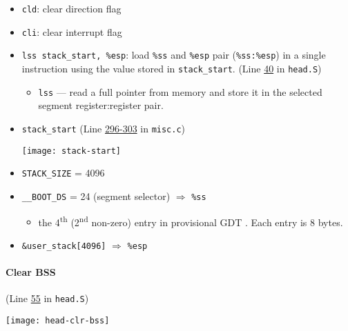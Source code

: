 \begin{itemize}
\item \texttt{cld}: clear direction flag
\item \texttt{cli}: clear interrupt flag
\item \verb|lss stack_start, %esp|: load \texttt{\%ss} and \texttt{\%esp} pair
  (\texttt{\%ss:\%esp}) in a single instruction using the value stored in
  \texttt{stack\_start}.  (Line
  \href{http://lxr.linux.no/linux+v2.6.11/arch/i386/boot/compressed/head.S\#L40}{40} in
  \texttt{head.S})
  \begin{itemize}
  \item \texttt{lss} --- read a full pointer from memory and store it in the selected
    segment register:register pair. 
  \end{itemize}
\item \texttt{stack\_start} (Line
  \href{http://lxr.linux.no/linux+v2.6.11/arch/i386/boot/compressed/misc.c\#L296}{296-303}
  in \texttt{misc.c})

  \begin{center}
    \texttt{[image: stack-start]}
  \end{center}

\item \texttt{STACK\_SIZE} = 4096
\item \texttt{\_\_BOOT\_DS} = 24 (segment selector) $\Rightarrow$ \texttt{\%ss}
  \begin{itemize}
  \item the 4\textsuperscript{th} (2\textsuperscript{nd} non-zero) entry in provisional
    GDT . Each entry is
    8 bytes.
  \end{itemize}
\item \texttt{\&user\_stack[4096]} $\Rightarrow$ \texttt{\%esp}
\end{itemize}

\paragraph{Clear BSS}

(Line
\href{http://lxr.linux.no/linux+v2.6.11/arch/i386/boot/compressed/head.S\#L55}{55} in
\texttt{head.S})

\begin{center}
  \texttt{[image: head-clr-bss]}
\end{center}
  

